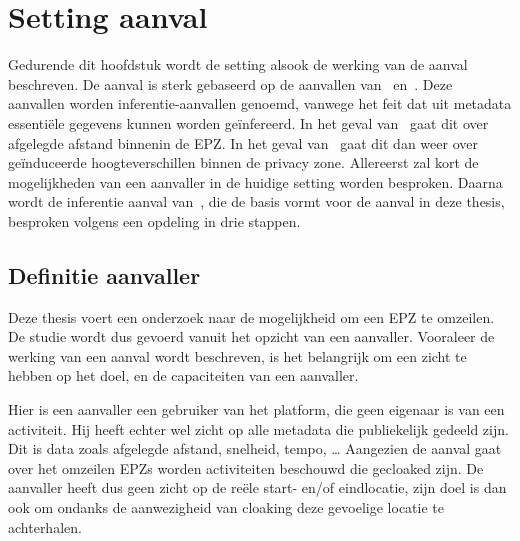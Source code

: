 
\chapter{Setting aanval}\label{chap:inferentieaanval}
Gedurende dit hoofdstuk wordt de setting alsook de werking van de aanval
beschreven. De aanval is sterk gebaseerd op de aanvallen
van~\citeauthor{Dhondt_Pochat_Voulimeneas_Joosen_Volckaert_2022}\cite{Dhondt_Pochat_Voulimeneas_Joosen_Volckaert_2022}
en~\citeauthor{Verdonck_2022}\cite{Verdonck_2022}. Deze aanvallen worden
inferentie-aanvallen genoemd, vanwege het feit dat uit metadata essentiële
gegevens kunnen worden geïnfereerd. In het geval
van~\citeauthor{Dhondt_Pochat_Voulimeneas_Joosen_Volckaert_2022} gaat dit over
afgelegde afstand binnenin de \ac{EPZ}. In het geval
van~\citeauthor{Verdonck_2022} gaat dit dan weer over geïnduceerde
hoogteverschillen binnen de privacy zone. Allereerst zal kort de mogelijkheden
van een aanvaller in de huidige setting worden besproken. Daarna wordt de
inferentie aanval
van~\citeauthor{Dhondt_Pochat_Voulimeneas_Joosen_Volckaert_2022}, die de basis
vormt voor de aanval in deze thesis, besproken volgens een opdeling in drie
stappen.

\section{Definitie aanvaller}
Deze thesis voert een onderzoek naar de mogelijkheid om een \ac{EPZ} te
omzeilen. De studie wordt dus gevoerd vanuit het opzicht van een aanvaller.
Vooraleer de werking van een aanval wordt beschreven, is het belangrijk om een
zicht te hebben op het doel, en de capaciteiten van een aanvaller.

Hier is een aanvaller een gebruiker van het platform, die geen eigenaar is van
een activiteit. Hij heeft echter wel zicht op alle metadata die publiekelijk
gedeeld zijn. Dit is data zoals afgelegde afstand, snelheid, tempo, \ldots
Aangezien de aanval gaat over het omzeilen \acp{EPZ} worden activiteiten
beschouwd die gecloaked zijn. De aanvaller heeft dus geen zicht op de reële
start- en/of eindlocatie, zijn doel is dan ook om ondanks de aanwezigheid van
cloaking deze gevoelige locatie te achterhalen.


